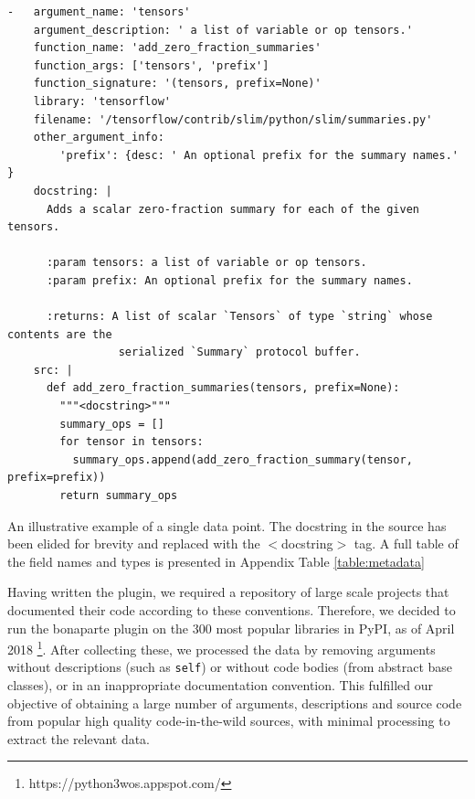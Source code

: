\begin{listing}[ht!]
\begin{verbatim}
-   argument_name: 'tensors'                                 
    argument_description: ' a list of variable or op tensors.'  
    function_name: 'add_zero_fraction_summaries'                
    function_args: ['tensors', 'prefix']                         
    function_signature: '(tensors, prefix=None)'                    
    library: 'tensorflow'                                
    filename: '/tensorflow/contrib/slim/python/slim/summaries.py'  
    other_argument_info:             
        'prefix': {desc: ' An optional prefix for the summary names.' }
    docstring: |
      Adds a scalar zero-fraction summary for each of the given tensors.

      :param tensors: a list of variable or op tensors.
      :param prefix: An optional prefix for the summary names.

      :returns: A list of scalar `Tensors` of type `string` whose contents are the
                 serialized `Summary` protocol buffer.
    src: |
      def add_zero_fraction_summaries(tensors, prefix=None):
        """<docstring>"""
        summary_ops = []
        for tensor in tensors:
          summary_ops.append(add_zero_fraction_summary(tensor, prefix=prefix))
        return summary_ops
\end{verbatim}
     \caption{An illustrative example of a single data point. The docstring in the source has been elided for brevity and replaced with the $<$docstring$>$ tag. A full table of the field names and types is presented in Appendix Table \ref{table:metadata}}
     \label{lst:single_point_short}
\end{listing}


Having written the plugin, we required a repository of large scale projects that documented their code according to these conventions. 
Therefore, we decided to run the bonaparte plugin on the 300 most popular libraries in PyPI, as of April 2018 \footnote{https://python3wos.appspot.com/}.
After collecting these, we processed the data by removing arguments without descriptions (such as \texttt{self}) or without code bodies (from abstract base classes), or in an inappropriate documentation convention. 
This fulfilled our objective of obtaining a large number of arguments, descriptions and source code from popular high quality code-in-the-wild sources, with minimal processing to extract the relevant data.

